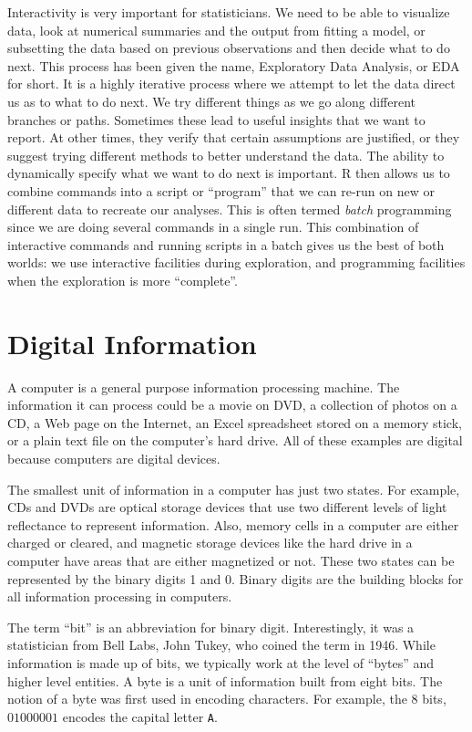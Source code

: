 Interactivity is very important for statisticians.  We need to be able
to visualize data, look at numerical summaries and the output from
fitting a model, or subsetting the data based on previous observations
and then decide what to do next.  This process has been given the
name, Exploratory Data Analysis, or EDA for short.  It is a highly
iterative process where we attempt to let the data direct us as to
what to do next.  We try different things as we go along different
branches or paths. Sometimes these lead to useful insights that we
want to report. At other times, they verify that certain assumptions
are justified, or they suggest trying different methods to better
understand the data.  The ability to dynamically specify what we want
to do next is important.  R then allows us to combine commands into a
script or ``program'' that we can re-run on new or different data to
recreate our analyses.  This is often termed \textit{batch}
programming since we are doing several commands in a single run. This
combination of interactive commands and running scripts in a batch
gives us the best of both worlds: we use interactive facilities during
exploration, and programming facilities when the exploration is more
``complete''.


\section{Digital Information}\label{sec:digital}
A computer is a general purpose information processing machine.  The
information it can process could be a movie on DVD, a collection of
photos on a CD, a Web page on the Internet, an Excel spreadsheet
stored on a memory stick, or a plain text file on the computer's hard
drive.  All of these examples are digital because computers are
digital devices.

The smallest unit of information in a computer has just two states.
For example, CDs and DVDs are optical storage devices that use two
different levels of light reflectance to represent information.  Also,
memory cells in a computer are either charged or cleared, and magnetic
storage devices like the hard drive in a computer have areas that are
either magnetized or not.  These two states can be represented by the
binary digits 1 and 0.  Binary digits are the building blocks for all
information processing in computers.

The term ``bit'' is an abbreviation for binary digit. Interestingly,
it was a statistician from Bell Labs, John Tukey, who coined the term
in 1946. While information is made up of bits, we typically work
at the level of ``bytes'' and higher level entities.  A byte is a unit
of information built from eight bits.  The notion of a byte was first
used in encoding characters. For example, the 8 bits, $01000001$
encodes the capital letter \verb+A+.

